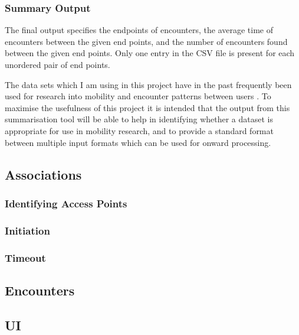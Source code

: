 
\subsubsection{Summary Output}
The final output specifies the endpoints of encounters, the average time of encounters between the given end points, and the number of encounters found between the given end points. Only one entry in the CSV file is present for each unordered pair of end points.\newline

The data sets which I am using in this project have in the past frequently been used for research into mobility and encounter patterns between users \cite{Scellato2011} \cite{Xiao2014} \cite{Hsu2010} \cite{Musolesi2009} \cite{Kosta2014} \cite{Kumar2009} \cite{Wei2013}. To maximise the usefulness of this project it is intended that the output from this  summarisation tool will be able to help in identifying whether a dataset is appropriate for use in mobility research, and to provide a standard format between multiple input formats which can be used for onward processing.

\subsection{Associations} 
\subsubsection{Identifying Access Points}

\subsubsection{Initiation} 

\subsubsection{Timeout} 

\subsection{Encounters} 


\subsection{UI} %
